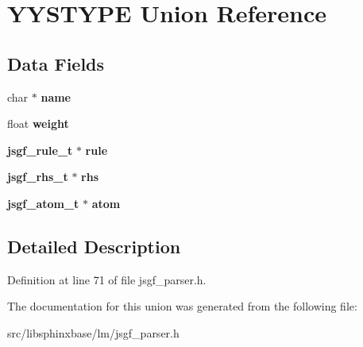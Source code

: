 \section{Y\+Y\+S\+T\+Y\+PE Union Reference}
\label{unionYYSTYPE}
\subsection*{Data Fields}
\begin{DoxyCompactItemize}
\item 
\mbox{\label{unionYYSTYPE_abe6c47e6bc1b2078e6717c0103b4ef02}} 
char $\ast$ {\bfseries name}
\item 
\mbox{\label{unionYYSTYPE_aac85eedd248804c0acb4be775be5bfd0}} 
float {\bfseries weight}
\item 
\mbox{\label{unionYYSTYPE_ac36b0d3e83c3867cb5fafc5d42bf3869}} 
\textbf{ jsgf\+\_\+rule\+\_\+t} $\ast$ {\bfseries rule}
\item 
\mbox{\label{unionYYSTYPE_a348bf1e5bbf1c61ed7cf8daecbb689b9}} 
\textbf{ jsgf\+\_\+rhs\+\_\+t} $\ast$ {\bfseries rhs}
\item 
\mbox{\label{unionYYSTYPE_a8647595b3993f58bc794592246a60fea}} 
\textbf{ jsgf\+\_\+atom\+\_\+t} $\ast$ {\bfseries atom}
\end{DoxyCompactItemize}


\subsection{Detailed Description}


Definition at line 71 of file jsgf\+\_\+parser.\+h.



The documentation for this union was generated from the following file\+:\begin{DoxyCompactItemize}
\item 
src/libsphinxbase/lm/jsgf\+\_\+parser.\+h\end{DoxyCompactItemize}
